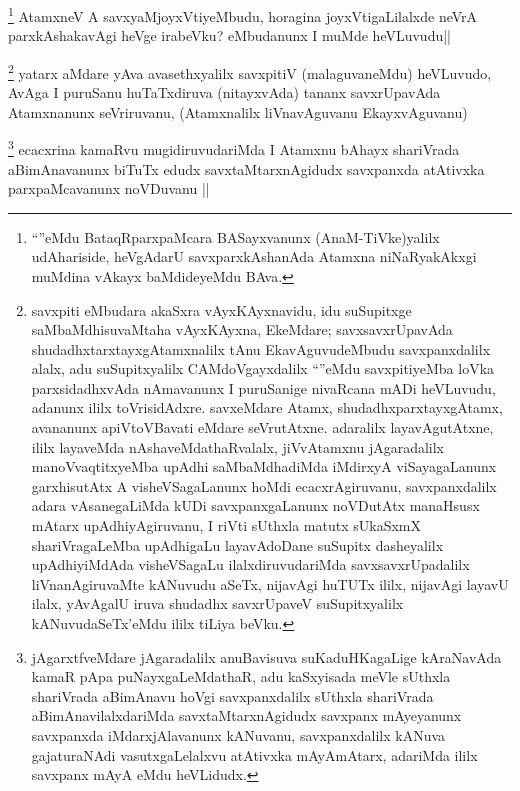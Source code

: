 
\begin{artha}
\footnote[1]{``\stext''eMdu BataqRparxpaMcara BASayxvanunx (AnaM-TiVke)yalilx udAhariside, heVgAdarU savxparxkAshanAda Atamxna niNaRyakAkxgi muMdina vAkayx baMdideyeMdu BAva.}
AtamxneV A savxyaMjoyxVtiyeMbudu, horagina joyxVtigaLilalxde neVrA parxkAshakavAgi heVge irabeVku? eMbudanunx I muMde heVLuvudu||
\end{artha}


\begin{artha}
\footnote[2]{savxpiti eMbudara akaSxra vAyxKAyxnavidu, idu suSupitxge saMbaMdhisuvaMtaha vAyxKAyxna, EkeMdare; savxsavxrUpavAda shudadhxtarxtayxgAtamxnalilx tAnu EkavAguvudeMbudu savxpanxdalilx alalx, adu suSupitxyalilx CAMdoVgayxdalilx ``\stext''eMdu savxpitiyeMba loVka parxsidadhxvAda nAmavanunx I puruSanige nivaRcana mADi heVLuvudu, adanunx ililx toVrisidAdxre. savxeMdare Atamx, shudadhxparxtayxgAtamx, avananunx apiVtoVBavati eMdare seVrutAtxne. adaralilx layavAgutAtxne, ililx layaveMda nAshaveMdathaRvalalx, jiVvAtamxnu jAgaradalilx manoVvaqtitxyeMba upAdhi saMbaMdhadiMda iMdirxyA viSayagaLanunx garxhisutAtx A visheVSagaLanunx hoMdi ecacxrAgiruvanu, savxpanxdalilx adara vAsanegaLiMda kUDi savxpanxgaLanunx noVDutAtx manaHsusx mAtarx upAdhiyAgiruvanu, I riVti sUthxla matutx sUkaSxmX shariVragaLeMba upAdhigaLu layavAdoDane suSupitx dasheyalilx upAdhiyiMdAda visheVSagaLu ilalxdiruvudariMda savxsavxrUpadalilx liVnanAgiruvaMte kANuvudu aSeTx, nijavAgi huTUTx ililx, nijavAgi layavU ilalx, yAvAgalU iruva shudadhx savxrUpaveV suSupitxyalilx kANuvudaSeTx'eMdu ililx tiLiya beVku.}
yatarx aMdare yAva avasethxyalilx savxpitiV (malaguvaneMdu) heVLuvudo, AvAga I puruSanu huTaTxdiruva (nitayxvAda) tananx savxrUpavAda Atamxnanunx seVriruvanu, (Atamxnalilx liVnavAguvanu EkayxvAguvanu)
\end{artha}


\begin{artha}
\footnote[1]{jAgarxtfveMdare jAgaradalilx anuBavisuva suKaduHKagaLige kAraNavAda kamaR pApa puNayxgaLeMdathaR, adu kaSxyisada meVle sUthxla shariVrada aBimAnavu hoVgi savxpanxdalilx sUthxla shariVrada aBimAnavilalxdariMda savxtaMtarxnAgidudx savxpanx mAyeyanunx savxpanxda iMdarxjAlavanunx kANuvanu, savxpanxdalilx kANuva gajaturaNAdi vasutxgaLelalxvu atAtivxka mAyAmAtarx, adariMda ililx savxpanx mAyA eMdu heVLidudx.}
ecacxrina kamaRvu mugidiruvudariMda I Atamxnu bAhayx shariVrada aBimAnavanunx biTuTx edudx savxtaMtarxnAgidudx savxpanxda atAtivxka parxpaMcavanunx noVDuvanu ||
\end{artha}

